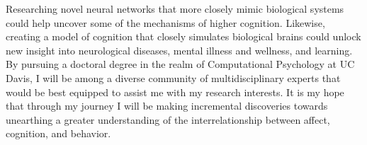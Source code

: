 \documentclass[12pt]{article}
\begin{document}
Researching novel neural networks that more closely mimic biological systems could help uncover some of the mechanisms of higher cognition.
Likewise, creating a model of cognition that closely simulates biological brains could unlock new insight into neurological diseases, mental
illness and wellness, and learning. By pursuing a doctoral degree in the realm of Computational Psychology at UC Davis, I will be among a
diverse community of multidisciplinary experts that would be best equipped to assist me with my research interests. It is my hope that
through my journey I will be making incremental discoveries towards unearthing a greater understanding of the interrelationship between
affect, cognition, and behavior.
\end{document}
